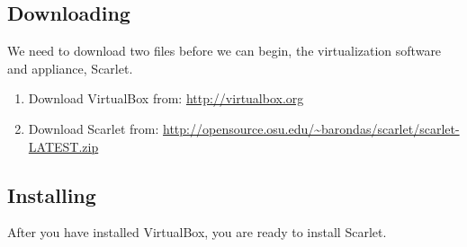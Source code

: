\documentclass[pdftex,11pt,letterpaper]{article}
\begin{document}
\subsection{Downloading}

We need to download two files before we can begin, the virtualization software and appliance, Scarlet.

\begin{enumerate}
  \item Download VirtualBox from: \url{http://virtualbox.org}
  \item Download Scarlet from: \url{http://opensource.osu.edu/~barondas/scarlet/scarlet-LATEST.zip}
\end{enumerate}

\subsection{Installing}

After you have installed VirtualBox, you are ready to install Scarlet.
\end{document}
